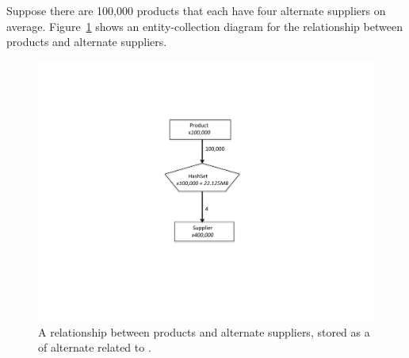 
Suppose there are 100,000 products that each have four alternate suppliers on
average. Figure~\ref{fig:product-hashset} shows an entity-collection diagram for
the relationship between products and alternate suppliers.
 \begin{figure}
  \centering
 \includegraphics[width=.80\textwidth]{part1/Figures/collections/product-hashset.pdf}
 \caption{A relationship between products and alternate suppliers,
  stored as a
   of alternate  related to .}
  \label{fig:product-hashset}
\end{figure}


%
%

